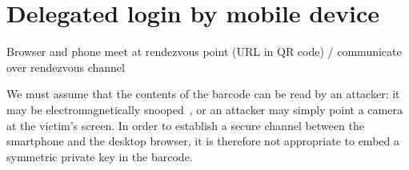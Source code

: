 \section{Delegated login by mobile device}
Browser and phone meet at rendezvous point (URL in QR code) / communicate over rendezvous channel

We must assume that the contents of the barcode can be read by an attacker: it may be
electromagnetically snooped~\cite{Kuhn05}, or an attacker may simply point a camera at the victim's
screen. In order to establish a secure channel between the smartphone and the desktop browser, it is
therefore not appropriate to embed a symmetric private key in the barcode.
